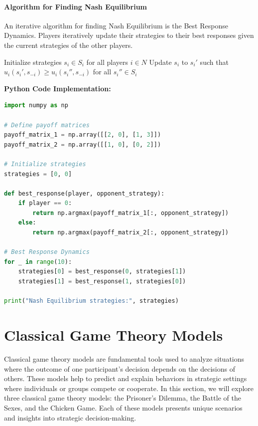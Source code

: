 \documentclass[12pt]{book} %
\begin{document}
\paragraph{Algorithm for Finding Nash Equilibrium}
An iterative algorithm for finding Nash Equilibrium is the Best Response Dynamics. Players iteratively update their strategies to their best responses given the current strategies of the other players.
\FloatBarrier
\begin{algorithm}
\caption{Best Response Dynamics}
\begin{algorithmic}[1]
\State Initialize strategies \( s_i \in S_i \) for all players \( i \in N \)
\Repeat
        \State Update \( s_i \) to \( s_i' \) such that \( u_i(s_i', s_{-i}) \geq u_i(s_i'', s_{-i}) \) for all \( s_i'' \in S_i \)
    \EndFor
{}
\end{algorithmic}
\end{algorithm}
\FloatBarrier
\textbf{Python Code Implementation:}
\FloatBarrier
\begin{lstlisting}[language=Python, caption=Best Response Dynamics in Python]
import numpy as np

# Define payoff matrices
payoff_matrix_1 = np.array([[2, 0], [1, 3]])
payoff_matrix_2 = np.array([[1, 0], [0, 2]])

# Initialize strategies
strategies = [0, 0]

def best_response(player, opponent_strategy):
    if player == 0:
        return np.argmax(payoff_matrix_1[:, opponent_strategy])
    else:
        return np.argmax(payoff_matrix_2[:, opponent_strategy])

# Best Response Dynamics
for _ in range(10):
    strategies[0] = best_response(0, strategies[1])
    strategies[1] = best_response(1, strategies[0])

print("Nash Equilibrium strategies:", strategies)
\end{lstlisting}
\FloatBarrier


\section{Classical Game Theory Models}
Classical game theory models are fundamental tools used to analyze situations where the outcome of one participant's decision depends on the decisions of others. These models help to predict and explain behaviors in strategic settings where individuals or groups compete or cooperate. In this section, we will explore three classical game theory models: the Prisoner's Dilemma, the Battle of the Sexes, and the Chicken Game. Each of these models presents unique scenarios and insights into strategic decision-making.
\end{document}
